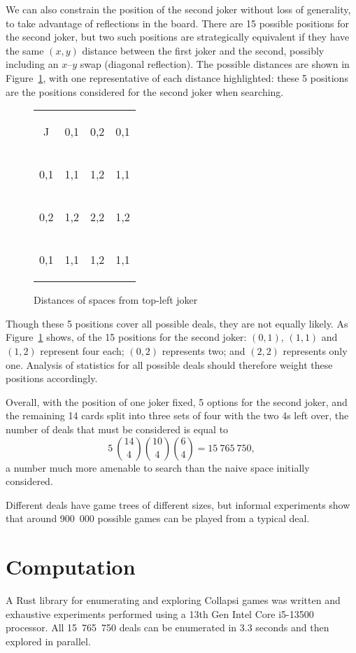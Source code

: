 \documentclass[a4paper, twocolumn]{article}
\newcommand\card[1]{\begin{tcolorbox}#1\end{tcolorbox}}
\newcommand\emphcard[1]{\begin{tcolorbox}[colback=red!30]#1\end{tcolorbox}}
\newcommand\customboard[8]{
  \setlength{\tabcolsep}{0.1cm}
  \begin{tabular}{c c c c}
    #1 & #2 & #3 & #4 \\
    #5 & #6 & #7 & #8 \\
    \customboardmore
}
\newcommand\customboardmore[8]{
    #1 & #2 & #3 & #4 \\
    #5 & #6 & #7 & #8
  \end{tabular}
}
\begin{document}
We can also constrain the position of the second joker without loss of
generality, to take advantage of reflections in the board. There are 15 possible positions for the second joker, but two
such positions are strategically equivalent if they have the same $(x, y)$
distance between the first joker and the second,
possibly including an $x$--$y$ swap (diagonal reflection). The possible distances are shown in
Figure~\ref{fig:joker-distances}, with one representative of each distance
highlighted: these 5 positions are the positions considered for the second joker
when searching.

\begin{figure}[ht]
  \centering
  \customboard
  {\card{J}} {\emphcard{0,1}} {\emphcard{0,2}} {\card{0,1}}
  {\card{0,1}} {\emphcard{1,1}} {\emphcard{1,2}} {\card{1,1}}
  {\card{0,2}} {\card{1,2}} {\emphcard{2,2}} {\card{1,2}}
  {\card{0,1}} {\card{1,1}} {\card{1,2}} {\card{1,1}}
  \caption{Distances of spaces from top-left joker}
  \label{fig:joker-distances}
\end{figure}

Though these 5 positions cover all possible deals, they are not equally
likely. As Figure~\ref{fig:joker-distances} shows, of the 15 positions for the
second joker: $(0,1)$, $(1,1)$ and $(1,2)$ represent four each; $(0,2)$
represents two; and $(2,2)$ represents only one. Analysis of statistics for all
possible deals should therefore weight these positions accordingly.

Overall, with the position of one joker fixed, 5 options for the second joker,
and the remaining 14 cards split into three sets of four with the two 4s left
over, the number of deals that must be considered is equal to
$$5~\binom{14}{4} \binom{10}{4} \binom{6}{4} = 15~765~750,$$
a number much more amenable to search than the naive space initially considered.

Different deals have game trees of different sizes, but informal experiments
show that around 900~000 possible games can be played from a typical deal.


\section{Computation}

A Rust library for enumerating and exploring Collapsi games was written
\cite{github} and exhaustive experiments performed using a 13th Gen Intel Core
i5-13500 processor. All 15~765~750 deals can be enumerated in 3.3 seconds and
then explored in parallel.
\end{document}
